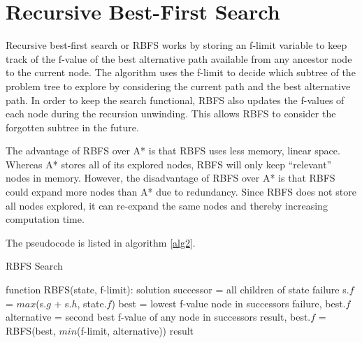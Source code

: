 \section{Recursive Best-First Search}

Recursive best-first search or RBFS works by storing an f-limit variable to keep track of the f-value of the best alternative path available from any ancestor node to the current node. The algorithm uses the f-limit to decide which subtree of the problem tree to explore by considering the current path and the best alternative path. In order to keep the search functional, RBFS also updates the f-values of each node during the recursion unwinding. This allows RBFS to consider the forgotten subtree in the future.

The advantage of RBFS over A* is that RBFS uses less memory, linear space. Whereas A* stores all of its explored nodes, RBFS will only keep ``relevant'' nodes in memory. However, the disadvantage of RBFS over A* is that RBFS could expand more nodes than A* due to redundancy. Since RBFS does not store all nodes explored, it can re-expand the same nodes and thereby increasing computation time.

The pseudocode is listed in algorithm \ref{alg2}.

\begin{algorithm}
\caption{RBFS Search}
\label{alg2}
\begin{algorithmic}
\STATE function RBFS(state, f-limit):
	\RETURN solution
\ENDIF
\STATE successor = all children of state
	\RETURN failure
\ELSE
		\STATE s.$f$ = $max$(s.$g$ + s.$h$, state.$f$)
	\ENDFOR
	\WHILE{\TRUE}
		\STATE best = lowest f-value node in successors
			\RETURN failure, best.$f$
		\ENDIF
		\STATE alternative = second best f-value of any node in successors
		\STATE result, best.$f$ = RBFS(best, $min$(f-limit, alternative))
			\RETURN result
		\ENDIF
	\ENDWHILE
\ENDIF
\end{algorithmic}
\end{algorithm}


